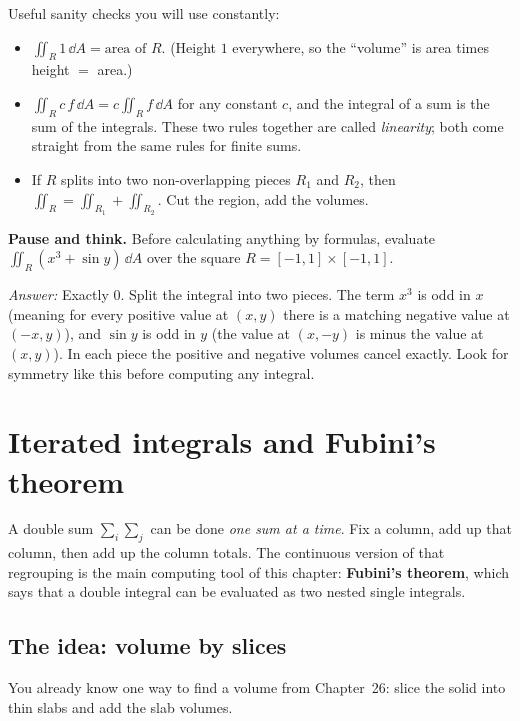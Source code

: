 \begin{focusbox}
Useful sanity checks you will use constantly:
\begin{itemize}
\item $\displaystyle\iint_R 1\,\dd A=\text{area of }R$. (Height $1$ everywhere,
so the ``volume'' is area times height $=$ area.)
\item $\displaystyle\iint_R c\,f\,\dd A=c\iint_R f\,\dd A$ for any constant $c$,
and the integral of a sum is the sum of the integrals. These two rules together
are called \emph{linearity}; both come straight from the same rules for finite
sums.
\item If $R$ splits into two non-overlapping pieces $R_1$ and $R_2$, then
$\iint_R=\iint_{R_1}+\iint_{R_2}$. Cut the region, add the volumes.
\end{itemize}
\end{focusbox}

\begin{recoverybox}
\textbf{Pause and think.}
Before calculating anything by formulas, evaluate $\iint_R (x^3 + \sin y)\,\dd A$
over the square $R = [-1,1]\times[-1,1]$.

\emph{Answer:} Exactly $0$. Split the integral into two pieces. The term $x^3$ is
odd in $x$ (meaning for every positive value at $(x,y)$ there is a matching negative value
at $(-x,y)$), and $\sin y$ is odd in $y$ (the value at $(x,-y)$ is minus the
value at $(x,y)$). In each piece the positive and negative volumes cancel
exactly. Look for symmetry like this before computing any integral.
\end{recoverybox}

\section{Iterated integrals and Fubini's theorem}
\label{ch34:fubini}

A double sum $\sum_i\sum_j$ can be done \emph{one sum at a time}. Fix a column,
add up that column, then add up the column totals. The continuous version of
that regrouping is the main computing tool of this chapter: \textbf{Fubini's
theorem}, which says that a double integral can be evaluated as two nested
single integrals.

\subsection{The idea: volume by slices}

You already know one way to find a volume from Chapter~26: slice the solid into
thin slabs and add the slab volumes.


